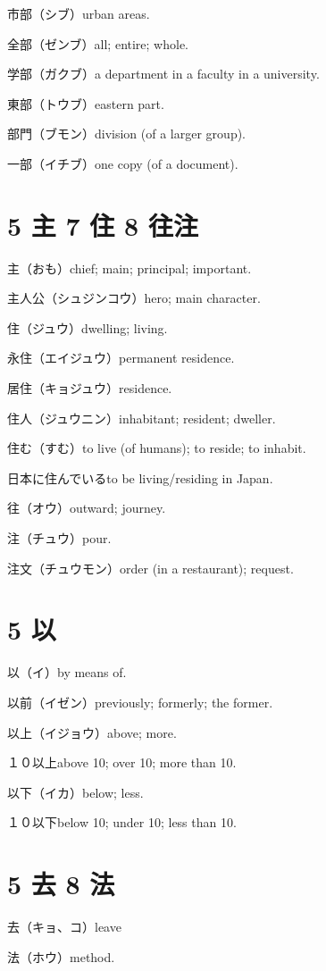 市部（シブ）urban areas.

全部（ゼンブ）all; entire; whole.

学部（ガクブ）a department in a faculty in a university.

東部（トウブ）eastern part.

部門（ブモン）division (of a larger group).

一部（イチブ）one copy (of a document).

\section{5 主 7 住 8 往注}

主（おも）chief; main; principal; important.

主人公（シュジンコウ）hero; main character.

住（ジュウ）dwelling; living.

永住（エイジュウ）permanent residence.

居住（キョジュウ）residence.

住人（ジュウニン）inhabitant; resident; dweller.

住む（すむ）to live (of humans); to reside; to inhabit.

日本に住んでいるto be living/residing in Japan.

往（オウ）outward; journey.

注（チュウ）pour.

注文（チュウモン）order (in a restaurant); request.

\section{5 以}

以（イ）by means of.

以前（イゼン）previously; formerly; the former.

以上（イジョウ）above; more.

１０以上above 10; over 10; more than 10.

以下（イカ）below; less.

１０以下below 10; under 10; less than 10.

\section{5 去 8 法}

去（キョ、コ）leave

法（ホウ）method.

